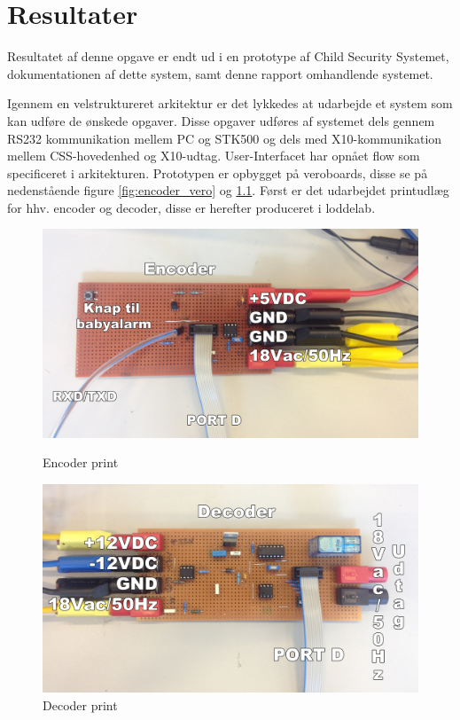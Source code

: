 \chapter{Resultater}
Resultatet af denne opgave er endt ud i en prototype af Child Security Systemet, dokumentationen af dette system, samt denne rapport omhandlende systemet.  

Igennem en velstruktureret arkitektur er det lykkedes at udarbejde et system som kan udføre de ønskede opgaver. Disse opgaver udføres af systemet dels gennem RS232 kommunikation mellem PC og STK500 og dels med X10-kommunikation mellem CSS-hovedenhed og X10-udtag. User-Interfacet har opnået flow som specificeret i arkitekturen. 
Prototypen er opbygget på veroboards, disse se på nedenstående figure \ref{fig:encoder_vero} og \ref{fig:decoder_vero}. Først er det udarbejdet printudlæg for hhv. encoder og decoder, disse er herefter produceret i loddelab. 

\begin{figure}[htb]
  \begin{minipage}{0.5\textwidth}
    \centering
      \includegraphics[width=\textwidth]{billeder/encoderveroboard}
      \caption{Encoder print}
    \label{fig:encoder_vero}
  \end{minipage}
  \hspace{0.1\textwidth}
  \begin{minipage}{0.5\textwidth}
    \centering
      \includegraphics[width=\textwidth]{billeder/decoderveroboard}
      \caption{Decoder print}
    \label{fig:decoder_vero}
  \end{minipage}
\end{figure}

